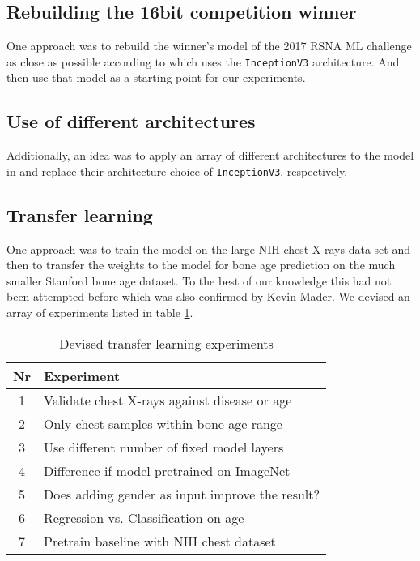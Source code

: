 \documentclass[10pt,twocolumn,letterpaper]{article}
\begin{document}
\subsection{Rebuilding the 16bit competition winner}
One approach was to rebuild the winner's model of the 2017 RSNA ML 
challenge as close as possible according to \cite{16bitrsnachallenge} which uses the \verb+InceptionV3+ architecture. And then use that model as a starting point for our experiments.

\subsection{Use of different architectures}
Additionally, an idea was to apply an array of different architectures to the model in \cite{16bitrsnachallenge} and replace their architecture choice of \verb+InceptionV3+, respectively.

\subsection{Transfer learning}
One approach was to train the model on the large NIH chest X-rays data set and then to transfer the weights to the model for bone age prediction on the much smaller Stanford bone age dataset. 
To the best of our knowledge this had not been attempted before which was also confirmed by Kevin Mader. We devised an array of experiments listed in table \ref{table:taexp}.

\begin{table}[h]
\begin{center}
\begin{tabular}{|c|l|}
\hline
Nr & Experiment \\
\hline\hline
1 & Validate chest X-rays against disease or age \\
2 & Only chest samples within bone age range \\
3 & Use different number of fixed model layers \\
4 & Difference if model pretrained on ImageNet \\
5 & Does adding gender as input improve the result? \\
6 & Regression vs. Classification on age \\
7 & Pretrain baseline \cite{kaggleboneage} with NIH chest dataset \\
\hline
\end{tabular}
\end{center}
\caption{Devised transfer learning experiments}
\label{table:taexp}
\end{table}
\end{document}
